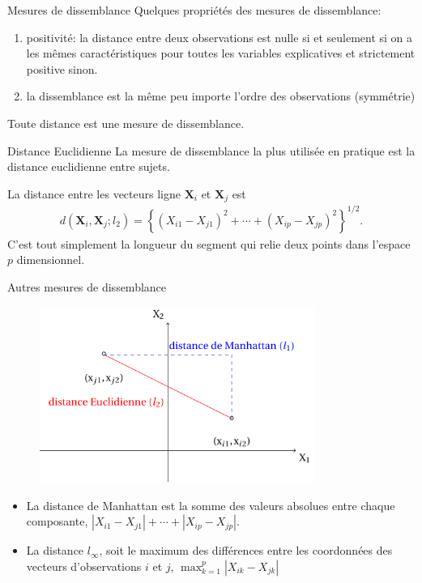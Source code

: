 \documentclass[
  ignorenonframetext,
]{beamer}
\providecommand{\tightlist}{%
  \setlength{\itemsep}{0pt}\setlength{\parskip}{0pt}}\usepackage{longtable,booktabs,array}
\begin{document}
\begin{frame}{Mesures de dissemblance}
\protect\hypertarget{mesures-de-dissemblance}{}
Quelques propriétés des mesures de dissemblance:

\begin{enumerate}
\tightlist
\item
  positivité: la distance entre deux observations est nulle si et
  seulement si on a les mêmes caractéristiques pour toutes les variables
  explicatives et strictement positive sinon.
\item
  la dissemblance est la même peu importe l'ordre des observations
  (symmétrie)
\end{enumerate}

Toute distance est une mesure de dissemblance.
\end{frame}

\begin{frame}{Distance Euclidienne}
\protect\hypertarget{distance-euclidienne}{}
La mesure de dissemblance la plus utilisée en pratique est la distance
euclidienne entre sujets.

La distance entre les vecteurs ligne \(\mathbf{X}_i\) et
\(\mathbf{X}_j\) est \begin{align*}
d(\mathbf{X}_i, \mathbf{X}_j; l_2) = \left\{(X_{i1}-X_{j1})^2 + \cdots + (X_{ip}-X_{jp})^2\right\}^{1/2}.
\end{align*} C'est tout simplement la longueur du segment qui relie deux
points dans l'espace \(p\) dimensionnel.
\end{frame}

\begin{frame}{Autres mesures de dissemblance}
\protect\hypertarget{autres-mesures-de-dissemblance}{}
\begin{figure}

{\centering \includegraphics[width=0.8\textwidth,height=\textheight]{figures/distance.pdf}

}

\end{figure}

\begin{itemize}
\tightlist
\item
  La distance de Manhattan est la somme des valeurs absolues entre
  chaque composante, \(|X_{i1}-X_{j1}| + \cdots + |X_{ip}-X_{jp}|\).
\item
  La distance \(l_\infty\), soit le maximum des différences entre les
  coordonnées des vecteurs d'observations \(i\) et \(j\),
  \(\max_{k=1}^p |X_{ik}-X_{jk}|\)
\end{itemize}
\end{frame}
\end{document}
